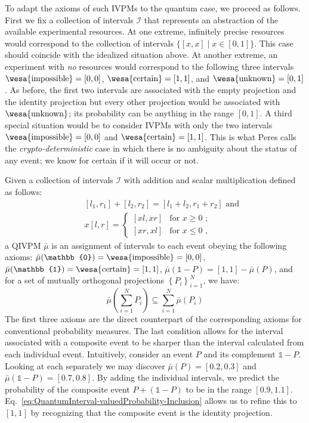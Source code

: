 \documentclass[english,reprint, aps, prl,superscriptaddress, showpacs,
showkeys, longbibliography, amsmath, amssymb]{revtex4-1}
\theoremstyle{plain}
\theoremstyle{definition}
\newcommand{\imposs}{{\text{\wesa{impossible}}}}
\newcommand{\necess}{{\text{\wesa{certain}}}}
\newcommand{\unknown}{{\text{\wesa{unknown}}}}
\begin{document}
To adapt the axioms of such IVPMs to the quantum case, we proceed as
follows. First we fix a collection of intervals $\mathscr{I}$ that
represents an abstraction of the available experimental resources. At
one extreme, infinitely precise resources would correspond to the
collection of intervals $\{[x,x] \mid x \in [0,1]\}$. This case should
coincide with the idealized situation above. At another extreme, an
experiment with \emph{no} resources would correspond to the following
three intervals $\imposs=\left[0,0\right]$,
$\necess=\left[1,1\right]$, and $\unknown=[0,1]$. As before, the first
two intervals are associated with the empty projection and the
identity projection but every other projection would be associated
with $\unknown$; its probability can be anything in the range
$[0,1]$. A third special situation would be to consider IVPMs with
only the two intervals $\imposs=\left[0,0\right]$ and
$\necess=\left[1,1\right]$. This is what Peres calls the
\emph{crypto-deterministic} case in which there is no ambiguity about
the status of any event; we know for certain if it will occur or not.

Given a collection of intervals $\mathscr{I}$ with addition and scalar
multiplication defined as follows: 
\begin{subequations}\label{eq:interval-operations}
\begin{eqnarray}
 &  & [l_{1},r_{1}]+[l_{2},r_{2}]=[l_{1}+l_{2},r_{1}+r_{2}]\textrm{ and}\\
 &  & x[l,r]=\begin{cases}
[xl,xr] & \textrm{for }x\ge0\textrm{ ;}\\{}
[xr,xl] & \textrm{for }x\le0\textrm{ ,}
\end{cases}
\end{eqnarray}
\end{subequations}
a QIVPM $\bar{\mu}$ is an assignment of intervals to each event
obeying the following axioms:
$\bar{\mu}(\mathbb{0})=\imposs=\left[0,0\right]$,
$\bar{\mu}(\mathbb{1})=\necess=\left[1,1\right]$,
$\bar{\mu}\left(\mathbb{1}-P\right)=\left[1,1\right]-\bar{\mu}\left(P\right)$,
and for a set of mutually orthogonal projections
$\left\{ P_{i}\right\} _{i=1}^{N}$, we have:
\begin{equation}
\bar{\mu}\left(\sum_{i=1}^{N}P_{i}\right)\subseteq\sum_{i=1}^{N}\bar{\mu}\left(P_{i}\right)\label{eq:QuantumInterval-valuedProbability-Inclusion}
\end{equation}
The first three axioms are the direct counterpart of the corresponding
axioms for conventional probability measures. The last condition
allows for the interval associated with a composite event to be
sharper than the interval calculated from each individual
event. Intuitively, consider an event $P$ and its complement
$\mathbb{1}-P$. Looking at each separately we may discover
$\bar{\mu}(P) = [0.2,0.3]$ and $\bar{\mu}(\mathbb{1}-P)=[0.7,0.8]$. By
adding the individual intervals, we predict the probability of the
composite event $P+(\mathbb{1}-P)$ to be in the range
$[0.9,1.1]$. Eq.~\ref{eq:QuantumInterval-valuedProbability-Inclusion}
allows us to refine this to $[1,1]$ by recognizing that the composite
event is the identity projection. 
\end{document}

